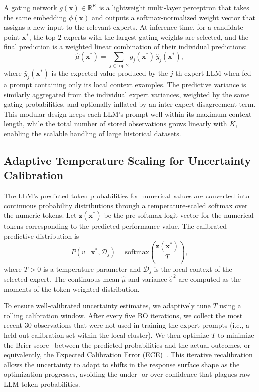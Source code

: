 \documentclass{article}
\begin{document}
A gating network $g(\mathbf{x}) \in \mathbb{R}^K$ is a lightweight multi‑layer perceptron that takes the same embedding $\phi(\mathbf{x})$ and outputs a softmax‑normalized weight vector that assigns a new input to the relevant experts. At inference time, for a candidate point $\mathbf{x}^*$, the top‑$2$ experts with the largest gating weights are selected, and the final prediction is a weighted linear combination of their individual predictions:
\begin{equation}
\hat{\mu}(\mathbf{x}^*) = \sum_{j \in \text{top-2}} g_j(\mathbf{x}^*) \, \hat{y}_j(\mathbf{x}^*),
\end{equation}
where $\hat{y}_j(\mathbf{x}^*)$ is the expected value produced by the $j$‑th expert LLM when fed a prompt containing only its local context examples. The predictive variance is similarly aggregated from the individual expert variances, weighted by the same gating probabilities, and optionally inflated by an inter‑expert disagreement term. This modular design keeps each LLM’s prompt well within its maximum context length, while the total number of stored observations grows linearly with $K$, enabling the scalable handling of large historical datasets.

\subsection{Adaptive Temperature Scaling for Uncertainty Calibration}
The LLM’s predicted token probabilities for numerical values are converted into continuous probability distributions through a temperature‑scaled softmax over the numeric tokens. Let $\mathbf{z}(\mathbf{x}^*)$ be the pre‑softmax logit vector for the numerical tokens corresponding to the predicted performance value. The calibrated predictive distribution is
\begin{equation}
P(v \mid \mathbf{x}^*, \mathcal{D}_j) = \text{softmax}\!\left( \frac{\mathbf{z}(\mathbf{x}^*)}{T} \right),
\end{equation}
where $T > 0$ is a temperature parameter and $\mathcal{D}_j$ is the local context of the selected expert. The continuous mean $\hat{\mu}$ and variance $\hat{\sigma}^2$ are computed as the moments of the token‑weighted distribution.

To ensure well‑calibrated uncertainty estimates, we adaptively tune $T$ using a rolling calibration window. After every five BO iterations, we collect the most recent $30$ observations that were not used in training the expert prompts (i.e., a held‑out calibration set within the local cluster). We then optimize $T$ to minimize the Brier score~\cite{brier1950verification} between the predicted probabilities and the actual outcomes, or equivalently, the Expected Calibration Error (ECE)~\cite{naeini2015obtaining}. This iterative recalibration allows the uncertainty to adapt to shifts in the response surface shape as the optimization progresses, avoiding the under‑ or over‑confidence that plagues raw LLM token probabilities.
\end{document}
